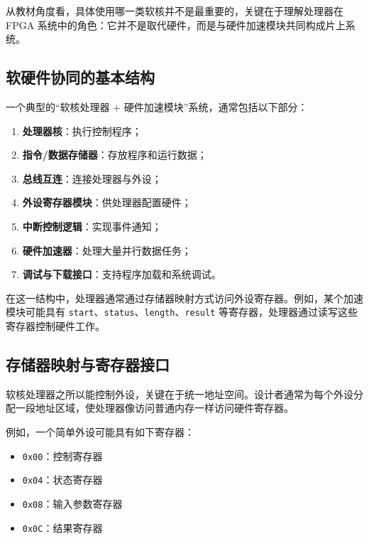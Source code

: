 从教材角度看，具体使用哪一类软核并不是最重要的，关键在于理解处理器在
FPGA
系统中的角色：它并不是取代硬件，而是与硬件加速模块共同构成片上系统。

\subsection{软硬件协同的基本结构}\label{ux8f6fux786cux4ef6ux534fux540cux7684ux57faux672cux7ed3ux6784}

一个典型的``软核处理器 + 硬件加速模块''系统，通常包括以下部分：

\begin{enumerate}
\def\labelenumi{\arabic{enumi}.}
\tightlist
\item
  \textbf{处理器核}：执行控制程序；
\item
  \textbf{指令/数据存储器}：存放程序和运行数据；
\item
  \textbf{总线互连}：连接处理器与外设；
\item
  \textbf{外设寄存器模块}：供处理器配置硬件；
\item
  \textbf{中断控制逻辑}：实现事件通知；
\item
  \textbf{硬件加速器}：处理大量并行数据任务；
\item
  \textbf{调试与下载接口}：支持程序加载和系统调试。
\end{enumerate}

在这一结构中，处理器通常通过存储器映射方式访问外设寄存器。例如，某个加速模块可能具有
\passthrough{\lstinline!start!}、\passthrough{\lstinline!status!}、\passthrough{\lstinline!length!}、\passthrough{\lstinline!result!}
等寄存器，处理器通过读写这些寄存器控制硬件工作。

\subsection{存储器映射与寄存器接口}\label{ux5b58ux50a8ux5668ux6620ux5c04ux4e0eux5bc4ux5b58ux5668ux63a5ux53e3}

软核处理器之所以能控制外设，关键在于统一地址空间。设计者通常为每个外设分配一段地址区域，使处理器像访问普通内存一样访问硬件寄存器。

例如，一个简单外设可能具有如下寄存器：

\begin{itemize}
\tightlist
\item
  \passthrough{\lstinline!0x00!}：控制寄存器\\
\item
  \passthrough{\lstinline!0x04!}：状态寄存器\\
\item
  \passthrough{\lstinline!0x08!}：输入参数寄存器\\
\item
  \passthrough{\lstinline!0x0C!}：结果寄存器
\end{itemize}

